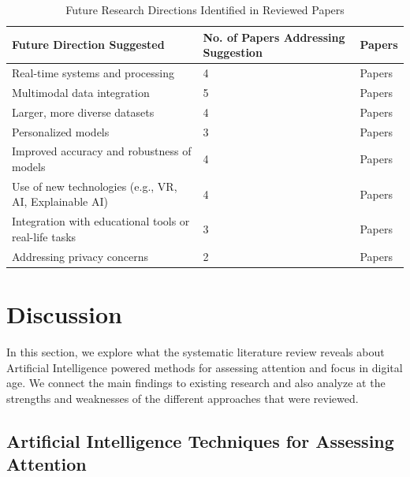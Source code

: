 \documentclass[twocolumn,12pt]{article}
\begin{document}
{\begin{table}[H]
\centering
\footnotesize
\setlength{\tabcolsep}{1pt}
\renewcommand{\arraystretch}{0.5}
\caption{Future Research Directions Identified in Reviewed Papers}
\begin{tabular}{|p{}|p{}|p{}|}
\hline
\textbf{Future Direction Suggested} & \textbf{No. of Papers Addressing Suggestion} & \textbf{Papers} \\
\hline
Real-time systems and processing & 4 & Papers~\citep{ref1,ref3,ref4,ref18} \\
\hline
Multimodal data integration & 5 & Papers~\citep{ref2,ref5,ref8,ref11,ref15} \\
\hline
Larger, more diverse datasets & 4 & Papers~\citep{ref2,ref3,ref5,ref11} \\
\hline
Personalized models & 3 & Papers~\citep{ref2,ref3,ref5} \\
\hline
Improved accuracy and robustness of models & 4 & Papers~\citep{ref5,ref6,ref9,ref17} \\
\hline
Use of new technologies (e.g., VR, AI, Explainable AI) & 4 & Papers~\citep{ref1,ref5,ref6,ref16} \\
\hline
Integration with educational tools or real-life tasks & 3 & Papers~\citep{ref1,ref6,ref7} \\
\hline
Addressing privacy concerns & 2 & Papers~\citep{ref6,ref8} \\
\hline
\end{tabular}
\end{table}

\section{Discussion}
In this section, we explore what the systematic literature review reveals about Artificial Intelligence powered methods for assessing attention and focus in digital age. We connect the main findings to existing research and also analyze at the strengths and weaknesses of the different approaches that were reviewed.

\subsection{ Artificial Intelligence Techniques for Assessing Attention} \\

}
\end{document}
